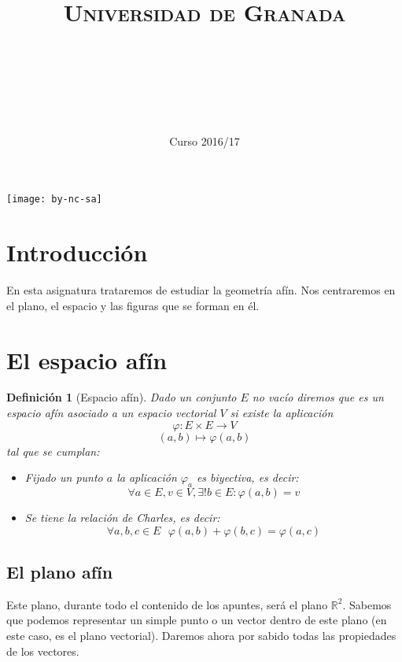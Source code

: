 \documentclass[11pt, a4paper, titlepage]{article}
\title{
  \normalfont \normalsize
  \textsc{Universidad de Granada} \\ [25pt]    %
  \horrule{0.5pt} \\[0.4cm] %
  \huge \subject\\ %
  \horrule{2pt} \\[0.5cm] %
}
\author{\Large{\docauthor}}
\date{\vspace{-1.5em} \normalsize Curso 2016/17}
\newcommand{\R}{\mathbb{R}}
\theoremstyle{theorem-style}
\theoremstyle{definition-style}
\newtheorem*{ndef}{Definición}
\theoremstyle{remark-style}
\theoremstyle{example-style}
\begin{document}
\maketitle  %
\tableofcontents    %
\vfill
\begin{center}
\texttt{[image: by-nc-sa]}  %
\end{center}
\newpage


\section*{Introducción}
En esta asignatura trataremos de estudiar la geometría afín. Nos centraremos en el plano, el espacio y las figuras que se forman en él.
\newpage

\section{El espacio afín}
\begin{ndef}[Espacio afín]
Dado un conjunto $E$ no vacío diremos que es un espacio afín asociado a un espacio vectorial $V$ si existe la aplicación
$$\varphi: E \times E \rightarrow V$$
$$(a,b) \mapsto \varphi(a,b)$$
tal que se cumplan:
\begin{itemize}
\item Fijado un punto $a$ la aplicación $\varphi_a$ es biyectiva, es decir:
$$\forall a \in E, v \in V, \exists! b \in E:\varphi(a,b)=v$$
\item Se tiene la relación de Charles, es decir:
$$\forall a, b, c \in E \ \ \  \varphi(a,b) + \varphi(b,c) = \varphi(a,c)$$
\end{itemize}
\end{ndef}
\subsection{El plano afín}
Este plano, durante todo el contenido de los apuntes, será el plano $\R^2$. Sabemos que podemos representar un simple punto o un vector dentro de este plano (en este caso, es el plano vectorial). Daremos ahora por sabido todas las propiedades de los vectores.

\begin{center}
\end{center}
\end{document}
